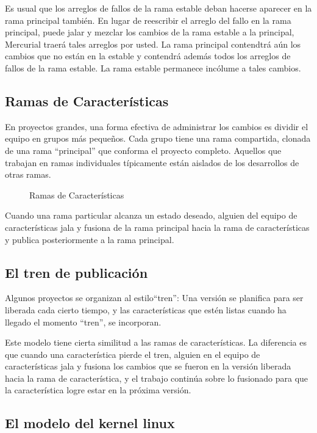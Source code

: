 Es usual que los arreglos de fallos de la rama estable deban hacerse
aparecer en la rama principal también.  En lugar de reescribir el
arreglo del fallo en la rama principal, puede jalar y mezclar los
cambios de la rama estable a la principal, Mercurial traerá tales
arreglos por usted.
La rama principal contendtrá aún los cambios que no están en la
estable y contendrá además todos los arreglos de fallos de la rama
estable.  La rama estable permanece incólume a tales cambios.

\subsection{Ramas de Características}

En proyectos grandes, una forma efectiva de administrar los cambios es
dividir el equipo en grupos más pequeños. Cada grupo tiene una rama
compartida, clonada de una rama ``principal'' que conforma el proyecto
completo.   Aquellos que trabajan en ramas individuales típicamente
están aislados de los desarrollos de otras ramas.

\begin{figure}[ht]
  \centering
  \caption{Ramas de Características}
  \label{fig:collab:feature-branches}
\end{figure}

Cuando una rama particular alcanza un estado deseado, alguien del
equipo de características jala y fusiona de la rama principal hacia
la rama de características y publica posteriormente a la rama principal.

\subsection{El tren de publicación}

Algunos proyectos se organizan al estilo``tren'': Una versión se
planifica para ser liberada cada cierto tiempo, y las características
que estén listas cuando ha llegado el momento ``tren'', se incorporan.

Este modelo tiene cierta similitud a las ramas de características. La
diferencia es que cuando una característica pierde el tren, alguien en
el equipo de características jala y fusiona los cambios que se fueron
en la versión liberada hacia la rama de característica, y el trabajo
continúa sobre lo fusionado para que la característica logre estar en
la próxima versión.

\subsection{El modelo del kernel linux}

